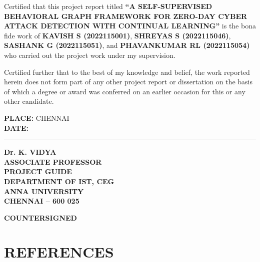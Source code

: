 \documentclass[12pt,a4paper]{report}
\begin{document}
\justifying
Certified that this project report titled \textbf{``A SELF-SUPERVISED BEHAVIORAL
GRAPH FRAMEWORK FOR ZERO-DAY CYBER ATTACK DETECTION WITH CONTINUAL LEARNING''} is
the bona fide work of \textbf{KAVISH S (2022115001)}, \textbf{SHREYAS S (2022115046)},
\textbf{SASHANK G (2022115051)}, and \textbf{PHAVANKUMAR RL (2022115054)} who
carried out the project work under my supervision.

Certified further that to the best of my knowledge and belief, the work reported
herein does not form part of any other project report or dissertation on the basis
of which a degree or award was conferred on an earlier occasion for this or any
other candidate.

\vspace{2cm}

\noindent
\begin{minipage}[t]{0.45\textwidth}
\textbf{PLACE:} CHENNAI\\[0.3cm]
\textbf{DATE:} \rule{3cm}{0.4pt}
\end{minipage}%
\hfill
\begin{minipage}[t]{0.5\textwidth}
\textbf{Dr. K. VIDYA}\\
\textbf{ASSOCIATE PROFESSOR}\\
\textbf{PROJECT GUIDE}\\
\textbf{DEPARTMENT OF IST, CEG}\\
\textbf{ANNA UNIVERSITY}\\
\textbf{CHENNAI -- 600 025}
\end{minipage}

\vspace{2.5cm}

\begin{center}
\textbf{COUNTERSIGNED}\\[1cm]
\end{center}

\newpage
\tableofcontents

\cleardoublepage
{}





\clearpage
\chapter*{REFERENCES}
\nocite{*}


\end{document}
